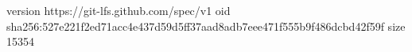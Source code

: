 version https://git-lfs.github.com/spec/v1
oid sha256:527e221f2ed71acc4e437d59d5ff37aad8adb7eee471f555b9f486dcbd42f59f
size 15354
